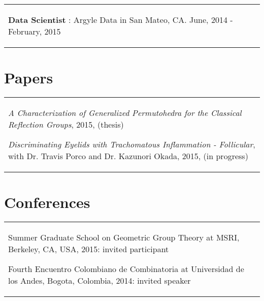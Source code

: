 \documentclass[margin,line,pifont,palatino,courier]{res}
\newenvironment{list1}{
  \begin{list}{\label{ } }{
      \setlength{\itemsep}{0in}
      \setlength{\parsep}{0in} \setlength{\parskip}{0in}
      \setlength{\topsep}{0in} \setlength{\partopsep}{0in}
      \setlength{\leftmargin}{0.0in} } }{\end{list} }
\begin{document}
\begin{resume}
\begin{tabular}{@{}p{5in}}
\begin{list1}
       
      \item {\bf Data Scientist }:  Argyle Data in San Mateo, CA. June, 2014 - February, 2015
      \vspace{.2em}
    
  \end{list1}
\end{tabular}

\section{\sc Papers}
  \begin{tabular}{@{}p{5in}}
    \begin{list1}
      
      
        
            \item {\em A Characterization of Generalized Permutohedra for the Classical Reflection Groups},  2015, (thesis)  
        
      \vspace{.5em}
      
        
      \vspace{.5em}
      
        
      \vspace{.5em}
      
        
            \item {\em Discriminating Eyelids with Trachomatous Inflammation - Follicular},  with Dr. Travis Porco and Dr. Kazunori Okada,  2015, (in progress)  
        
      \vspace{.5em}
      
    \end{list1}
  \end{tabular}



\section{\sc Conferences}
  \begin{tabular}{@{}p{5in}}
    \begin{list1}
    
      
         \item  { Summer Graduate School on Geometric Group Theory }  at MSRI, Berkeley, CA, USA, 2015:  invited participant
      \vspace{.2em}
      
         \item  { Fourth Encuentro Colombiano de Combinatoria }  at Universidad de los Andes, Bogota, Colombia, 2014:  invited speaker
      \vspace{.2em}
      

\end{list1}
\end{tabular}
\end{resume}
\end{document}

